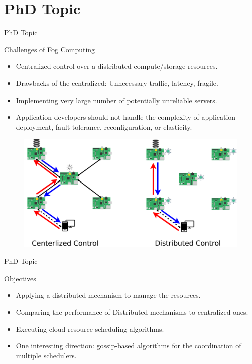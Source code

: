 \documentclass{beamer}
\begin{document}
\section{PhD Topic}
\begin{frame}{PhD Topic}
 \begin{block}{Challenges of Fog Computing}
    \begin{itemize}
    \item Centralized control over a distributed compute/storage resources.
    \item<2-> Drawbacks of the centralized: Unnecessary traffic, latency, fragile.
    \item<3-> Implementing very large number of potentially unreliable servers.
    \item<4-> Application developers should not handle the complexity of application deployment, fault tolerance, reconfiguration, or elasticity.
      
    \end{itemize}
    
    \end{block}
    
    \begin{figure}[ht]


 \includegraphics[width=.69\linewidth]{fog.png}
\end{figure}
\end{frame}

\begin{frame}{PhD Topic}


\begin{block}{Objectives}
    \begin{itemize}
    
    \item Applying a distributed mechanism to manage the resources. 
    \item<2-> Comparing the performance of Distributed mechanisms to centralized ones. 
    \item<3-> Executing cloud resource scheduling algorithms.
    \item<4->  One interesting direction: gossip-based algorithms for the coordination of multiple schedulers.
      
    \end{itemize}
    
    \end{block}
 \end{frame}
    
\end{document}
